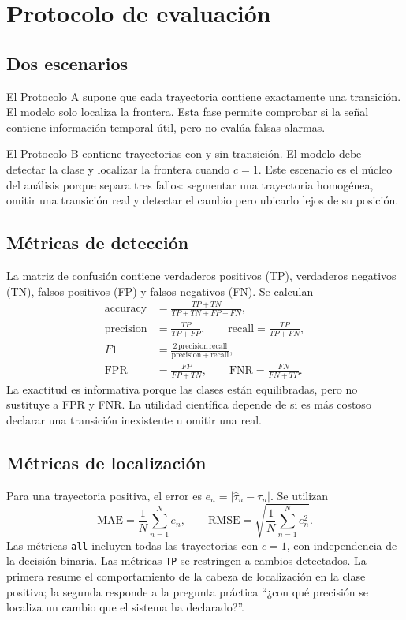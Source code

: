 \documentclass[a4paper,12pt]{article}
\begin{document}
\section{Protocolo de evaluación}

\subsection{Dos escenarios}

El Protocolo A supone que cada trayectoria contiene exactamente una transición. El modelo solo localiza la frontera. Esta fase permite comprobar si la señal contiene información temporal útil, pero no evalúa falsas alarmas.

El Protocolo B contiene trayectorias con y sin transición. El modelo debe detectar la clase y localizar la frontera cuando $c=1$. Este escenario es el núcleo del análisis porque separa tres fallos: segmentar una trayectoria homogénea, omitir una transición real y detectar el cambio pero ubicarlo lejos de su posición.

\subsection{Métricas de detección}

La matriz de confusión contiene verdaderos positivos (TP), verdaderos negativos (TN), falsos positivos (FP) y falsos negativos (FN). Se calculan
\begin{align}
 \mathrm{accuracy}&=\frac{TP+TN}{TP+TN+FP+FN},\\
 \mathrm{precision}&=\frac{TP}{TP+FP},\qquad
 \mathrm{recall}=\frac{TP}{TP+FN},\\
 F1&=\frac{2\,\mathrm{precision}\,\mathrm{recall}}
 {\mathrm{precision}+\mathrm{recall}},\\
 \mathrm{FPR}&=\frac{FP}{FP+TN},\qquad
 \mathrm{FNR}=\frac{FN}{FN+TP}.
\end{align}
La exactitud es informativa porque las clases están equilibradas, pero no sustituye a FPR y FNR. La utilidad científica depende de si es más costoso declarar una transición inexistente u omitir una real.

\subsection{Métricas de localización}

Para una trayectoria positiva, el error es $e_n=|\widehat\tau_n-\tau_n|$. Se utilizan
\begin{equation}
 \mathrm{MAE}=\frac{1}{N}\sum_{n=1}^{N}e_n,
 \qquad
 \mathrm{RMSE}=\sqrt{\frac{1}{N}\sum_{n=1}^{N}e_n^2}.
\end{equation}
Las métricas \texttt{all} incluyen todas las trayectorias con $c=1$, con independencia de la decisión binaria. Las métricas \texttt{TP} se restringen a cambios detectados. La primera resume el comportamiento de la cabeza de localización en la clase positiva; la segunda responde a la pregunta práctica ``¿con qué precisión se localiza un cambio que el sistema ha declarado?''.
\end{document}
